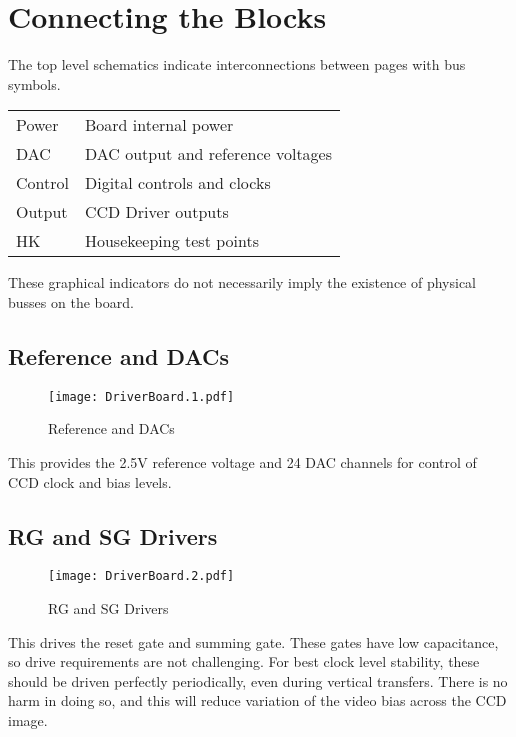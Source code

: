 \documentclass[a4paper,12pt]{article}
\begin{document}
\section{Connecting the Blocks}

The top level schematics indicate interconnections between pages with bus symbols.

\begin{tabular}{ll}
Power & Board internal power \\
DAC & DAC output and reference voltages \\
Control & Digital controls and clocks \\
Output & CCD Driver outputs \\
HK & Housekeeping test points \\
\end{tabular}

These graphical indicators do not necessarily imply the existence of physical busses on the board.

\subsection{Reference and DACs}
   \begin{figure}
   \begin{center}
   \texttt{[image: DriverBoard.1.pdf]}
   \end{center}
   \caption{Reference and DACs}
   \end{figure}
   
This provides the 2.5V reference voltage and 24 DAC channels for control of CCD clock and bias levels.
  

\subsection{RG and SG Drivers}
   \begin{figure}
   \begin{center}
   \texttt{[image: DriverBoard.2.pdf]}
   \end{center}
   \caption{RG and SG Drivers}
   \end{figure}

This drives the reset gate and summing gate. These gates have low capacitance, so drive requirements are not challenging. For best clock level stability, these should be driven perfectly periodically, even during vertical transfers. There is no harm in doing so, and this will reduce variation of the video bias across the CCD image.
  
\end{document}

